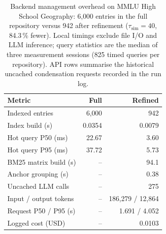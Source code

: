 \begin{table}[t]
    \centering
    \caption{Backend management overhead on MMLU High School Geography: 6{,}000 entries in the
    full repository versus 942 after refinement ($\tau_{\mathrm{sim}}=40$, 84.3\,\% fewer). Local
    timings exclude file I/O and LLM inference; query statistics are the median of three measurement
    sessions (825 timed queries per repository). API rows summarise the historical uncached
    condensation requests recorded in the run log.}
    \label{tab:backend_overhead}
    \footnotesize
    \setlength{\tabcolsep}{3pt}
    \renewcommand{\arraystretch}{1.06}
    \begin{tabular}{lrr}
        \hline
        Metric & Full & Refined \\
        \hline
        Indexed entries & 6{,}000 & 942 \\
        Index build (s) & 0.0354 & 0.0079 \\
        Hot query P50 (ms) & 22.67 & 3.60 \\
        Hot query P95 (ms) & 37.72 & 5.73 \\
        \hline
        BM25 matrix build (s) & -- & 94.1 \\
        Anchor grouping (s) & -- & 0.38 \\
        \hline
        Uncached LLM calls & -- & 275 \\
        Input / output tokens & -- & 186{,}279 / 12{,}864 \\
        Request P50 / P95 (s) & -- & 1.691 / 4.052 \\
        Logged cost (USD) & -- & 0.0103 \\
        \hline
    \end{tabular}
\end{table}
